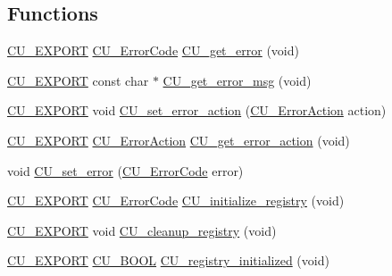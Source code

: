 \subsection*{Functions}
\begin{DoxyCompactItemize}
\item 
\hyperlink{group___framework_ga22e538403fdee24be3388ab473fe64d5}{C\+U\+\_\+\+E\+X\+P\+O\+R\+T} \hyperlink{group___framework_ga743a2a025ee3eb792d7d85f0eea347e6}{C\+U\+\_\+\+Error\+Code} \hyperlink{group___framework_ga0bf3f9733e5fa0c0ed6ca0a37a2d995e}{C\+U\+\_\+get\+\_\+error} (void)
\item 
\hyperlink{group___framework_ga22e538403fdee24be3388ab473fe64d5}{C\+U\+\_\+\+E\+X\+P\+O\+R\+T} const char $\ast$ \hyperlink{group___framework_gaee27bf496da77437288bc9fe2a0b20ed}{C\+U\+\_\+get\+\_\+error\+\_\+msg} (void)
\item 
\hyperlink{group___framework_ga22e538403fdee24be3388ab473fe64d5}{C\+U\+\_\+\+E\+X\+P\+O\+R\+T} void \hyperlink{group___framework_ga58f4bdc1a05802f89005a487768b3d75}{C\+U\+\_\+set\+\_\+error\+\_\+action} (\hyperlink{group___framework_ga50053b4edbfc96a88027dd57c580ca35}{C\+U\+\_\+\+Error\+Action} action)
\item 
\hyperlink{group___framework_ga22e538403fdee24be3388ab473fe64d5}{C\+U\+\_\+\+E\+X\+P\+O\+R\+T} \hyperlink{group___framework_ga50053b4edbfc96a88027dd57c580ca35}{C\+U\+\_\+\+Error\+Action} \hyperlink{group___framework_gab2e98ce95448aa5a04a4875bc8152d6e}{C\+U\+\_\+get\+\_\+error\+\_\+action} (void)
\item 
void \hyperlink{group___framework_ga58bf87d9e3fa751ca0c5d2aea7f846b7}{C\+U\+\_\+set\+\_\+error} (\hyperlink{group___framework_ga743a2a025ee3eb792d7d85f0eea347e6}{C\+U\+\_\+\+Error\+Code} error)
\item 
\hyperlink{group___framework_ga22e538403fdee24be3388ab473fe64d5}{C\+U\+\_\+\+E\+X\+P\+O\+R\+T} \hyperlink{group___framework_ga743a2a025ee3eb792d7d85f0eea347e6}{C\+U\+\_\+\+Error\+Code} \hyperlink{group___framework_ga3477b2d3e57c8f8aba36bbbdfa54920d}{C\+U\+\_\+initialize\+\_\+registry} (void)
\item 
\hyperlink{group___framework_ga22e538403fdee24be3388ab473fe64d5}{C\+U\+\_\+\+E\+X\+P\+O\+R\+T} void \hyperlink{group___framework_ga183eb7d7f79e149c767237cfef52cb82}{C\+U\+\_\+cleanup\+\_\+registry} (void)
\item 
\hyperlink{group___framework_ga22e538403fdee24be3388ab473fe64d5}{C\+U\+\_\+\+E\+X\+P\+O\+R\+T} \hyperlink{group___framework_gabd98d449e979a6379b06551242106dd4}{C\+U\+\_\+\+B\+O\+O\+L} \hyperlink{group___framework_gab976af96105872cb082ff4835cac1696}{C\+U\+\_\+registry\+\_\+initialized} (void)

\end{DoxyCompactItemize}
